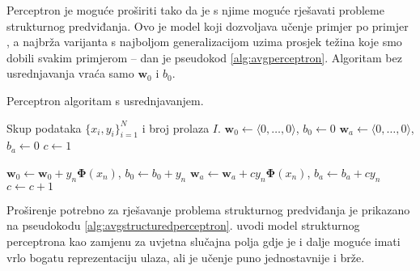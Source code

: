 Perceptron \citep{rosenblatt1958perceptron} je moguće proširiti tako da je s
njime moguće rješavati probleme strukturnog predviđanja. Ovo je model koji
dozvoljava učenje primjer po primjer , a najbrža varijanta
s najboljom generalizacijom uzima prosjek težina koje smo dobili svakim
primjerom \citep{freund1999large,gentile2002new} -- dan je pseudokod
\ref{alg:avgperceptron}. Algoritam bez usrednjavanja vraća samo $\mathbf{w}_0$ i
$b_0$.

\begin{algorithm}
\caption{Perceptron algoritam s usrednjavanjem.}\label{alg:avgperceptron}
\begin{algorithmic}[1]
\Require Skup podataka $\{x_i, y_i\}_{i=1}^N$ i broj prolaza $I$.
\State $\mathbf{w}_0 \gets \langle 0, \ldots, 0 \rangle$, $b_0 \gets 0$
\State $\mathbf{w}_a \gets \langle 0, \ldots, 0 \rangle$, $b_a \gets 0$
\State $c \gets 1$


    \State $\mathbf{w}_0 \gets \mathbf{w}_0 + y_n \mathbf{\Phi}(x_n)$, $b_0 \gets b_0 + y_n$
    \State $\mathbf{w}_a \gets \mathbf{w}_a + c y_n \mathbf{\Phi}(x_n)$, $b_a \gets b_a + c y_n$
    \EndIf
    \State $c \gets c + 1$
  \EndFor

\EndFor

\State {}
\end{algorithmic}
\end{algorithm}

Proširenje potrebno za rješavanje problema strukturnog predviđanja je prikazano
na pseudokodu \ref{alg:avgstructuredperceptron}.
\citet{collins2002discriminative} uvodi model strukturnog perceptrona
 kao zamjenu za uvjetna slučajna polja gdje je i
dalje moguće imati vrlo bogatu reprezentaciju ulaza, ali je učenje puno
jednostavnije i brže.

